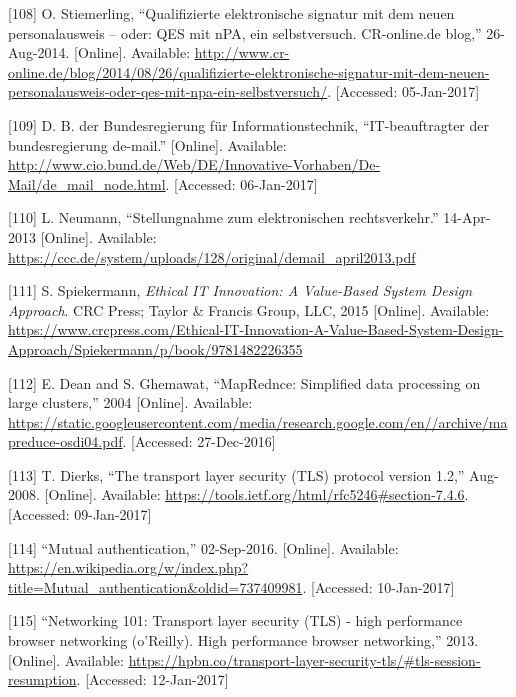 \documentclass[12pt,english,a4paper,titlepage,cleardoublepage=empty,dottedtoc]{report}
\begin{document}
\hypertarget{ref-web_2014_test-qes-support-in-npa}{}
{[}108{]} O. Stiemerling, ``Qualifizierte elektronische signatur mit dem
neuen personalausweis -- oder: QES mit nPA, ein selbstversuch.
CR-online.de blog,'' 26-Aug-2014. {[}Online{]}. Available:
\url{http://www.cr-online.de/blog/2014/08/26/qualifizierte-elektronische-signatur-mit-dem-neuen-personalausweis-oder-qes-mit-npa-ein-selbstversuch/}.
{[}Accessed: 05-Jan-2017{]}

\hypertarget{ref-web_2017_about-de-mail}{}
{[}109{]} D. B. der Bundesregierung für Informationstechnik,
``IT-beauftragter der bundesregierung de-mail.'' {[}Online{]}.
Available:
\url{http://www.cio.bund.de/Web/DE/Innovative-Vorhaben/De-Mail/de_mail_node.html}.
{[}Accessed: 06-Jan-2017{]}

\hypertarget{ref-statement_2013_de-mail}{}
{[}110{]} L. Neumann, ``Stellungnahme zum elektronischen
rechtsverkehr.'' 14-Apr-2013 {[}Online{]}. Available:
\url{https://ccc.de/system/uploads/128/original/demail_april2013.pdf}

\hypertarget{ref-book_2015_ethical-it-innovation}{}
{[}111{]} S. Spiekermann, \emph{Ethical IT Innovation: A Value-Based
System Design Approach}. CRC Press; Taylor \& Francis Group, LLC, 2015
{[}Online{]}. Available:
\url{https://www.crcpress.com/Ethical-IT-Innovation-A-Value-Based-System-Design-Approach/Spiekermann/p/book/9781482226355}

\hypertarget{ref-paper_2004_distributed-mapreduce}{}
{[}112{]} E. Dean and S. Ghemawat, ``MapRednce: Simplified data
processing on large clusters,'' 2004 {[}Online{]}. Available:
\url{https://static.googleusercontent.com/media/research.google.com/en//archive/mapreduce-osdi04.pdf}.
{[}Accessed: 27-Dec-2016{]}

\hypertarget{ref-web_spec_tls-12_client-auth}{}
{[}113{]} T. Dierks, ``The transport layer security (TLS) protocol
version 1.2,'' Aug-2008. {[}Online{]}. Available:
\url{https://tools.ietf.org/html/rfc5246\#section-7.4.6}. {[}Accessed:
09-Jan-2017{]}

\hypertarget{ref-web_2017_wikipedia_mutual-auth}{}
{[}114{]} ``Mutual authentication,'' 02-Sep-2016. {[}Online{]}.
Available:
\url{https://en.wikipedia.org/w/index.php?title=Mutual_authentication\&oldid=737409981}.
{[}Accessed: 10-Jan-2017{]}

\hypertarget{ref-book_2013_networking-101_tls-session-resumption}{}
{[}115{]} ``Networking 101: Transport layer security (TLS) - high
performance browser networking (o'Reilly). High performance browser
networking,'' 2013. {[}Online{]}. Available:
\url{https://hpbn.co/transport-layer-security-tls/\#tls-session-resumption}.
{[}Accessed: 12-Jan-2017{]}
\end{document}
